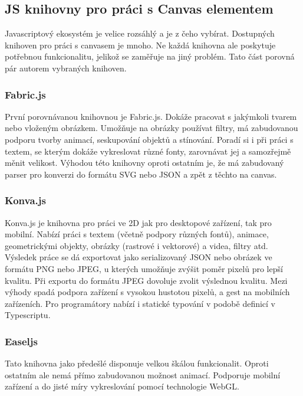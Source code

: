         \subsection{JS knihovny pro práci s Canvas elementem}
        Javascriptový ekosystém je velice rozsáhlý a je z čeho vybírat. Dostupných knihoven pro práci s canvasem je mnoho.
        Ne každá knihovna ale poskytuje potřebnou funkcionalitu,
        jelikož se zaměřuje na jiný problém. Tato část porovná pár autorem vybraných knihoven.

            \subsubsection{Fabric.js}
            První porovnávanou knihovnou je Fabric.js. Dokáže pracovat s jakýmkoli tvarem nebo vloženým obrázkem. Umožňuje na obrázky používat filtry,
            má zabudovanou podporu tvorby animací, seskupování objektů a stínování. Poradí si i při práci s textem, se kterým dokáže vykreslovat různé fonty,
            zarovnávat jej a samozřejmě měnit velikost.
            Výhodou této knihovny oproti ostatním je, že má zabudovaný parser pro konverzi do formátu SVG nebo JSON a zpět z těchto na canvas.  
            
            \subsubsection{Konva.js}
            Konva.js je knihovna pro práci ve 2D jak pro desktopové zařízení, tak pro mobilní. Nabízí práci s textem (včetně podpory různých fontů),
            animace, geometrickými objekty, obrázky (rastrové i vektorové) a videa, filtry atd. Výsledek práce se dá exportovat jako serializovaný
            JSON nebo obrázek ve formátu PNG nebo JPEG, u kterých umožňuje zvýšit poměr pixelů pro lepší kvalitu.
            Při exportu do formátu JPEG dovoluje zvolit výslednou kvalitu. Mezi výhody spadá podpora zařízení s vysokou hustotou pixelů, a gest na mobilních zařízeních.
            Pro programátory nabízí i statické typování v podobě definicí v Typescriptu. 

            \subsubsection{Easeljs}
            Tato knihovna jako předešlé disponuje velkou škálou funkcionalit.
            Oproti ostatním ale nemá přímo zabudovanou možnost animací.
            Podporuje mobilní zařízení a do jisté míry vykreslování pomocí technologie WebGL.


